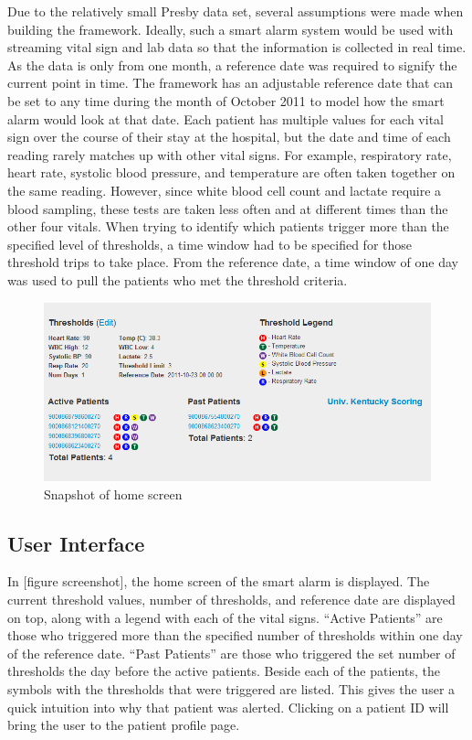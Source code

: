 \documentclass{sig-alternate}
\begin{document}
Due to the relatively small Presby data set, several assumptions were made when building the framework.  Ideally, such a smart alarm system would be used with streaming vital sign and lab data so that the information is collected in real time.  As the data is only from one month, a reference date was required to signify the current point in time.  The framework has an adjustable reference date that can be set to any time during the month of October 2011 to model how the smart alarm would look at that date.  Each patient has multiple values for each vital sign over the course of their stay at the hospital, but the date and time of each reading rarely matches up with other vital signs.  For example, respiratory rate, heart rate, systolic blood pressure, and temperature are often taken together on the same reading.  However, since white blood cell count and lactate require a blood sampling, these tests are taken less often and at different times than the other four vitals.  When trying to identify which patients trigger more than the specified level of thresholds, a time window had to be specified for those threshold trips to take place.  From the reference date, a time window of one day was used to pull the patients who met the threshold criteria.  

\begin{figure}
	\begin{center}
		\includegraphics[width=1.0\linewidth]{MainScreen.png}
	\end{center}
	\caption{Snapshot of home screen}
	\label{fig:home}
\end{figure}

\subsection{User Interface}
\label{subsec:ui}
\vspace{10pt}

In [figure screenshot], the home screen of the smart alarm is displayed.  The current threshold values, number of thresholds, and reference date are displayed on top, along with a legend with each of the vital signs.  ``Active Patients'' are those who triggered more than the specified number of thresholds within one day of the reference date. ``Past Patients'' are those who triggered the set number of thresholds the day before the active patients.  Beside each of the patients, the symbols with the thresholds that were triggered are listed.  This gives the user a quick intuition into why that patient was alerted.  Clicking on a patient ID will bring the user to the patient profile page.
\end{document}
